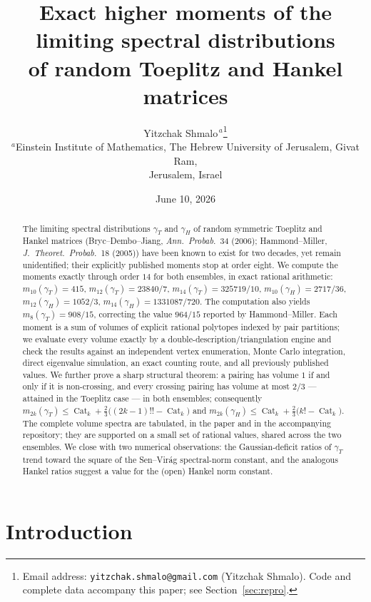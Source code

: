﻿\documentclass[11pt]{article}
\title{Exact higher moments of the limiting spectral distributions\\
of random Toeplitz and Hankel matrices}
\author{Yitzchak Shmalo$^{\,a}$\thanks{Email address:
\texttt{yitzchak.shmalo@gmail.com} (Yitzchak Shmalo). Code and complete data
accompany this paper; see Section~\ref{sec:repro}.}\\[2pt]
{\small $^{a}$Einstein Institute of Mathematics, The Hebrew University of
Jerusalem, Givat Ram,}\\[-2pt]
{\small Jerusalem, Israel}}
\date{June 10, 2026}
\theoremstyle{remark}
\newcommand{\Cat}{\operatorname{Cat}}
\newcommand{\gT}{\gamma_T}
\newcommand{\gH}{\gamma_H}
\begin{document}
\maketitle

\begin{abstract}
The limiting spectral distributions $\gT$ and $\gH$ of random symmetric Toeplitz and
Hankel matrices (Bryc--Dembo--Jiang, \emph{Ann.\ Probab.}\ 34 (2006); Hammond--Miller,
\emph{J.\ Theoret.\ Probab.}\ 18 (2005)) have been known to exist for two decades, yet
remain unidentified; their explicitly published moments stop at order eight. We compute
the moments exactly through order $14$ for both ensembles, in exact rational
arithmetic:
$m_{10}(\gT)=415$, $m_{12}(\gT)=23840/7$, $m_{14}(\gT)=325719/10$,
$m_{10}(\gH)=2717/36$, $m_{12}(\gH)=1052/3$, $m_{14}(\gH)=1331087/720$. The
computation also yields $m_8(\gT)=908/15$, correcting the value $964/15$ reported by
Hammond--Miller. Each moment is a sum of
volumes of explicit rational polytopes indexed by pair partitions; we evaluate every
volume exactly by a double-description/triangulation engine and check the results
against an independent vertex enumeration, Monte Carlo integration, direct eigenvalue
simulation, an exact counting route, and all previously published values.
We further prove a sharp structural theorem: a pairing has volume $1$ if and only if
it is non-crossing, and every crossing pairing has volume at most $2/3$ --- attained
in the Toeplitz case --- in both ensembles; consequently
$m_{2k}(\gT)\le \Cat_k+\tfrac23\big((2k-1)!!-\Cat_k\big)$ and
$m_{2k}(\gH)\le \Cat_k+\tfrac23\big(k!-\Cat_k\big)$. The complete volume spectra are
tabulated, in the paper and in the accompanying repository; they are supported on a
small set of rational values, shared across the two ensembles. We close with two numerical observations: the Gaussian-deficit ratios of
$\gT$ trend toward the square of the Sen--Vir\'ag spectral-norm constant, and the
analogous Hankel ratios suggest a value for the (open) Hankel norm constant.
\end{abstract}

\section{Introduction}
\end{document}
